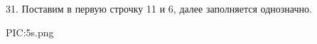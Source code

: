 31. Поставим в первую строчку 11 и 6, далее заполняется однозначно.
\begin{center}
{{PIC:5s.png}}
\end{center}

